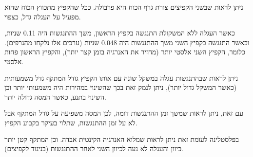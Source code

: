 \documentclass[14pt]{extarticle}
\begin{document}
ניתן לראות שבשני הקפיצים צורת גרף הכוח היא פרבולה. ככל שהקפיץ מתכווץ הכוח שהוא מפעיל על העגלה גדל, כצפוי.

כאשר העגלה ללא המשקולת התנגשה בקפיץ הראשון, משך ההתנגשות   היה 0.11 שניות, וכאשר התנגשה בקפיץ השני משך ההתנגשות  היה  0.048 שניות (ערכים אלו נלקחו מהגרפים).
כלומר, הקפיץ השני אלסטי יותר (מחזיר את  האנרגיה בזמן קצר יותר), והקפיץ הראשון פחות אלסטי.

ניתן לראות שבהתנגשות עגלה במשקל שונה עם אותו הקפיץ גודל המתקף גדל משמעותית (כאשר המשקל גדול יותר), ניתן לנמק זאת בכך שהשינוי במהירות היה משמעותי יותר וכן השינוי בתנע, כאשר המסה גדולה יותר.

עם זאת, ניתן לראות שמשך זמן ההתנגשות דומה, לכן המסה משפיעה על גודל המתקף אבל לא על זמן ההתנגשות, שתלוי בעיקר בקבוע הקפיץ.

בפלסטלינה לעומת זאת ניתן לראות שמלוא האנרגיה הקינטית אבדה. וכן המתקף קטן יותר כיוון והעגלה לא נעה לכיוון השני לאחר ההתנגשות (בניגוד לקפיצים).
\end{document}

